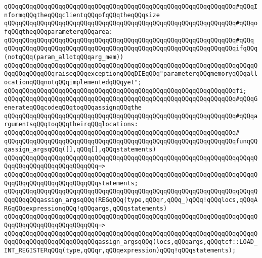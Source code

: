 \newline
\verb|qQQqqQQqqQQqqQQqqQQqqQQqqQQqqQQqqQQqqQQqqQQqqQQqqQQqqQQqqQQqqQQq#qQQqInformqQQqtheqQQqclientqQQqofqQQqtheqQQqsize|\newline
\verb|qQQqqQQqqQQqqQQqqQQqqQQqqQQqqQQqqQQqqQQqqQQqqQQqqQQqqQQqqQQqqQQq#qQQqofqQQqtheqQQqparameterqQQqarea:|\newline
\verb|qQQqqQQqqQQqqQQqqQQqqQQqqQQqqQQqqQQqqQQqqQQqqQQqqQQqqQQqqQQqqQQq#qQQq|\newline
\verb|qQQqqQQqqQQqqQQqqQQqqQQqqQQqqQQqqQQqqQQqqQQqqQQqqQQqqQQqqQQqqQQqifqQQq(notqQQq(param_allotqQQqarg_mem))|\newline
\newline
\verb|qQQqqQQqqQQqqQQqqQQqqQQqqQQqqQQqqQQqqQQqqQQqqQQqqQQqqQQqqQQqqQQqqQQqqQQqqQQqqQQqqQQqraiseqQQqexceptionqQQqDIEqQQq"parameterqQQqmemoryqQQqallocationqQQqnotqQQqimplementedqQQqyet";|\newline
\verb|qQQqqQQqqQQqqQQqqQQqqQQqqQQqqQQqqQQqqQQqqQQqqQQqqQQqqQQqqQQqqQQqfi;|\newline
\newline
\verb|qQQqqQQqqQQqqQQqqQQqqQQqqQQqqQQqqQQqqQQqqQQqqQQqqQQqqQQqqQQqqQQq#qQQqGenerateqQQqcodeqQQqtoqQQqassignqQQqthe|\newline
\verb|qQQqqQQqqQQqqQQqqQQqqQQqqQQqqQQqqQQqqQQqqQQqqQQqqQQqqQQqqQQqqQQq#qQQqargumentsqQQqtoqQQqtheirqQQqlocations:|\newline
\verb|qQQqqQQqqQQqqQQqqQQqqQQqqQQqqQQqqQQqqQQqqQQqqQQqqQQqqQQqqQQqqQQq#|\newline
\verb|qQQqqQQqqQQqqQQqqQQqqQQqqQQqqQQqqQQqqQQqqQQqqQQqqQQqqQQqqQQqqQQqfunqQQqassign_argsqQQq([],qQQq[],qQQqstatements)|\newline
\verb|qQQqqQQqqQQqqQQqqQQqqQQqqQQqqQQqqQQqqQQqqQQqqQQqqQQqqQQqqQQqqQQqqQQqqQQqqQQqqQQqqQQqqQQqqQQqqQQq=>|\newline
\verb|qQQqqQQqqQQqqQQqqQQqqQQqqQQqqQQqqQQqqQQqqQQqqQQqqQQqqQQqqQQqqQQqqQQqqQQqqQQqqQQqqQQqqQQqqQQqqQQqstatements;|\newline
\newline
\verb|qQQqqQQqqQQqqQQqqQQqqQQqqQQqqQQqqQQqqQQqqQQqqQQqqQQqqQQqqQQqqQQqqQQqqQQqqQQqqQQqassign_argsqQQq(REGqQQq(type,qQQqr,qQQq_)qQQq!qQQqlocs,qQQqARGqQQqexpressionqQQq!qQQqargs,qQQqstatements)|\newline
\verb|qQQqqQQqqQQqqQQqqQQqqQQqqQQqqQQqqQQqqQQqqQQqqQQqqQQqqQQqqQQqqQQqqQQqqQQqqQQqqQQqqQQqqQQqqQQqqQQq=>|\newline
\verb|qQQqqQQqqQQqqQQqqQQqqQQqqQQqqQQqqQQqqQQqqQQqqQQqqQQqqQQqqQQqqQQqqQQqqQQqqQQqqQQqqQQqqQQqqQQqqQQqassign_argsqQQq(locs,qQQqargs,qQQqtcf::LOAD_INT_REGISTERqQQq(type,qQQqr,qQQqexpression)qQQq!qQQqstatements);|\newline
